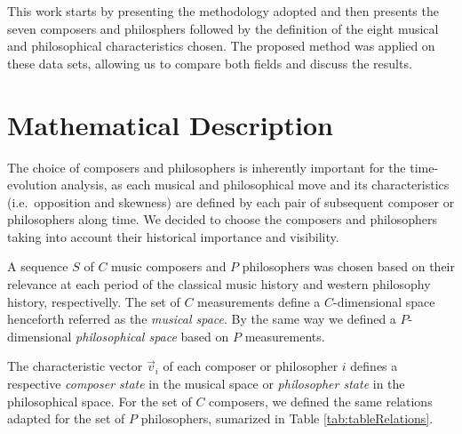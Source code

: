 \documentclass[
 aip,
 jmp,
 amsmath,amssymb,
 reprint,
]{revtex4-1}
\begin{document}
This work starts by presenting the methodology adopted and then
presents the seven composers and philosphers followed by the definition of the eight musical and philosophical characteristics chosen. The proposed method was applied on these data sets, allowing us to compare both fields and discuss the results.

\section{Mathematical Description}

The choice of composers and philosophers is inherently important for the
time-evolution analysis, as each musical and philosophical move and its
characteristics (i.e.\ opposition and skewness) are defined by each
pair of subsequent composer or philosophers along time.  We decided to choose the
composers and philosophers taking into account their historical importance and
visibility. 


A sequence $S$ of $C$ music composers and $P$ philosophers was chosen based on their
relevance at each period of the classical music history and western philosophy history, respectivelly. The set of $C$ measurements
define a $C$-dimensional space henceforth referred as the \emph{musical space}. By the same way we defined a $P$-dimensional \emph{philosophical space} based on $P$ measurements.  

The characteristic vector $\vec{v}_i$ of each composer or philosopher $i$ defines a respective \emph{composer state} in the musical space or \emph{philosopher state} in the philosophical space. For the set of
$C$ composers, we defined the same relations adapted for the set of $P$ philosophers, sumarized in Table \ref{tab:tableRelations}. 
\end{document}
